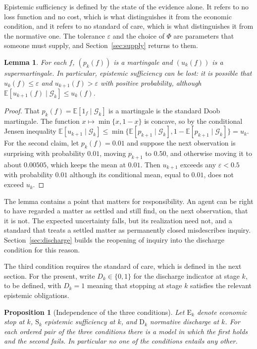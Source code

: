 \documentclass[11pt]{article}
\newcommand{\G}{\mathcal G}
\newcommand{\E}{\mathbb E}
\theoremstyle{plain}
\newtheorem{proposition}{Proposition}
\newtheorem{lemma}{Lemma}
\theoremstyle{definition}
\begin{document}
Epistemic sufficiency is defined by the state of the evidence alone. It refers to no loss function and no cost, which is what distinguishes it from the economic condition, and it refers to no standard of care, which is what distinguishes it from the normative one. The tolerance $\varepsilon$ and the choice of $\Phi$ are parameters that someone must supply, and Section~\ref{sec:supply} returns to them.

\begin{lemma}\label{lem:uncertainty}
For each $f$, $(p_k(f))$ is a martingale and $(u_k(f))$ is a supermartingale. In particular, epistemic sufficiency can be lost: it is possible that $u_k(f)\le\varepsilon$ and $u_{k+1}(f)>\varepsilon$ with positive probability, although $\E[u_{k+1}(f)\mid\G_k]\le u_k(f)$.
\end{lemma}

\begin{proof}
That $p_k(f)=\E[1_f\mid\G_k]$ is a martingale is the standard Doob martingale. The function $x\mapsto\min\{x,1-x\}$ is concave, so by the conditional Jensen inequality $\E[u_{k+1}\mid\G_k]\le \min\{\E[p_{k+1}\mid\G_k],1-\E[p_{k+1}\mid\G_k]\}=u_k$. For the second claim, let $p_k(f)=0.01$ and suppose the next observation is surprising with probability $0.01$, moving $p_{k+1}$ to $0.50$, and otherwise moving it to about $0.00505$, which keeps the mean at $0.01$. Then $u_{k+1}$ exceeds any $\varepsilon<0.5$ with probability $0.01$ although its conditional mean, equal to $0.01$, does not exceed $u_k$.
\end{proof}

The lemma contains a point that matters for responsibility. An agent can be right to have regarded a matter as settled and still find, on the next observation, that it is not. The expected uncertainty falls, but its realization need not, and a standard that treats a settled matter as permanently closed misdescribes inquiry. Section~\ref{sec:discharge} builds the reopening of inquiry into the discharge condition for this reason.

The third condition requires the standard of care, which is defined in the next section. For the present, write $D_k\in\{0,1\}$ for the discharge indicator at stage $k$, to be defined, with $D_k=1$ meaning that stopping at stage $k$ satisfies the relevant epistemic obligations.

\begin{proposition}[Independence of the three conditions]\label{prop:independence}
Let $\mathrm{E}_k$ denote economic stop at $k$, $\mathrm{S}_k$ epistemic sufficiency at $k$, and $\mathrm{D}_k$ normative discharge at $k$. For each ordered pair of the three conditions there is a model in which the first holds and the second fails. In particular no one of the conditions entails any other.
\end{proposition}
\end{document}
